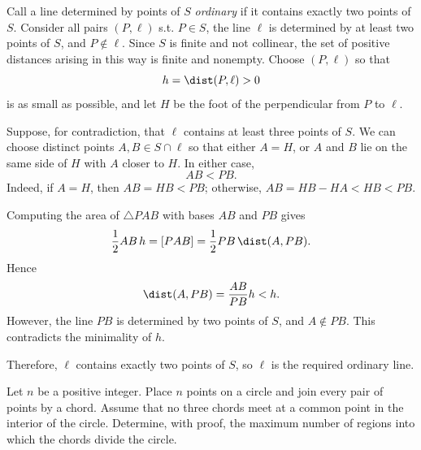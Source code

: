     \begin{solution}
        Call a line determined by points of $S$ \emph{ordinary} if it contains
        exactly two points of $S$. Consider all pairs $(P,\ell)$ s.t.
        $P\in S$, the line $\ell$ is determined by at least two points of $S$,
        and $P\notin\ell$. Since $S$ is finite and not collinear, the set of
        positive distances arising in this way is finite and nonempty. Choose
        $(P,\ell)$ so that
        \[
            h=\dist(P,\ell)>0
        \]
        is as small as possible, and let $H$ be the foot of the perpendicular
        from $P$ to $\ell$.

        Suppose, for contradiction, that $\ell$ contains at least three points
        of $S$. We can choose distinct points $A,B\in S\cap\ell$ so that either
        $A=H$, or $A$ and $B$ lie on the same side of $H$ with $A$ closer to
        $H$. In either case,
        \[
            AB<PB.
        \]
        Indeed, if $A=H$, then $AB=HB<PB$; otherwise,
        $AB=HB-HA<HB<PB$.

        Computing the area of $\triangle PAB$ with bases $AB$ and $PB$ gives
        \[
            \frac12 AB\,h
            =
            [PAB]
            =
            \frac12 PB\,\dist(A,PB).
        \]
        Hence
        \[
            \dist(A,PB)
            =
            \frac{AB}{PB}h
            <
            h.
        \]
        However, the line $PB$ is determined by two points of $S$, and
        $A\notin PB$. This contradicts the minimality of $h$.

        Therefore, $\ell$ contains exactly two points of $S$, so $\ell$ is the
        required ordinary line.
    \end{solution}

    \begin{expectedproblem}
        Let $n$ be a positive integer. Place $n$ points on a circle and join
        every pair of points by a chord.
        Assume that no three chords meet at a common point in the interior of
        the circle. Determine, with proof, the maximum number of regions into
        which the chords divide the circle.
    \end{expectedproblem}

